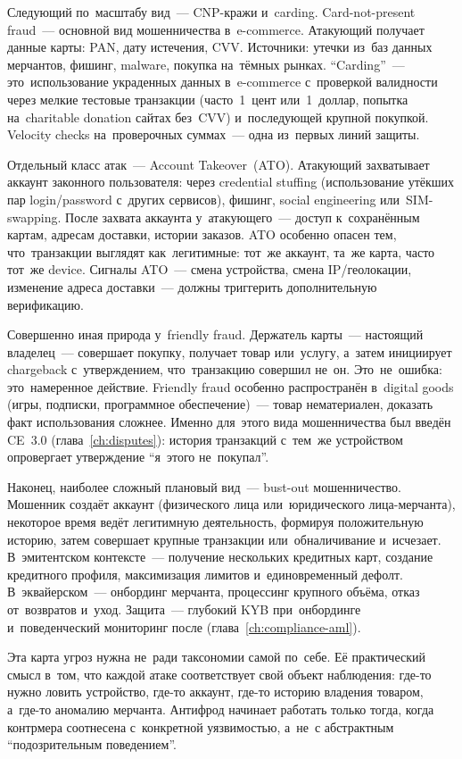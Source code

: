 Следующий по~масштабу вид~--- CNP-кражи и~carding. Card-not-present fraud~--- основной вид
мошенничества в~e-commerce. Атакующий получает данные карты: PAN, дату
истечения, CVV. Источники: утечки из~баз данных мерчантов, фишинг,
malware, покупка на~тёмных рынках. \enquote{Carding}~--- это~использование
украденных данных в~e-commerce с~проверкой валидности через мелкие
тестовые транзакции (часто~1~цент или~1~доллар, попытка на~charitable
donation сайтах без~CVV) и~последующей крупной покупкой. Velocity
checks на~проверочных суммах~--- одна из~первых линий защиты.

Отдельный класс атак~--- Account Takeover~(ATO). Атакующий захватывает аккаунт законного
пользователя: через credential stuffing (использование утёкших пар
login/password с~других сервисов), фишинг, social engineering или~SIM-swapping.
После захвата аккаунта у~атакующего~--- доступ к~сохранённым картам,
адресам доставки, истории заказов. ATO особенно опасен тем, что~транзакции
выглядят как~легитимные: тот~же аккаунт, та~же карта, часто тот~же
device. Сигналы ATO~--- смена устройства, смена IP/геолокации, изменение
адреса доставки~--- должны триггерить дополнительную верификацию.

Совершенно иная природа у~friendly fraud. Держатель карты~--- настоящий владелец~---
совершает покупку, получает товар или~услугу, а~затем инициирует chargeback
с~утверждением, что~транзакцию совершил не~он. Это~не~ошибка: это~намеренное
действие. Friendly fraud особенно распространён в~digital goods (игры,
подписки, программное обеспечение)~--- товар нематериален, доказать
факт использования сложнее. Именно для~этого вида мошенничества был
введён CE~3.0 (глава~\ref{ch:disputes}): история транзакций с~тем~же
устройством опровергает утверждение \enquote{я~этого не~покупал}.

Наконец, наиболее сложный плановый вид~--- bust-out мошенничество. Мошенник
создаёт аккаунт (физического лица или~юридического лица-мерчанта),
некоторое время ведёт легитимную деятельность, формируя положительную
историю, затем совершает крупные транзакции или~обналичивание и~исчезает.
В~эмитентском контексте~--- получение нескольких кредитных карт, создание
кредитного профиля, максимизация лимитов и~единовременный дефолт.
В~эквайерском~--- онбординг мерчанта, процессинг крупного объёма,
отказ от~возвратов и~уход. Защита~--- глубокий KYB при~онбординге и~поведенческий
мониторинг после (глава~\ref{ch:compliance-aml}).

Эта карта угроз нужна не~ради таксономии самой по~себе. Её практический
смысл в~том, что каждой атаке соответствует свой объект наблюдения:
где-то нужно ловить устройство, где-то аккаунт, где-то историю владения
товаром, а~где-то аномалию мерчанта. Антифрод начинает работать только
тогда, когда контрмера соотнесена с~конкретной уязвимостью, а~не~с
абстрактным \enquote{подозрительным поведением}.


